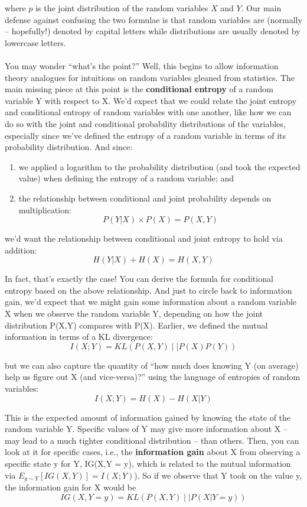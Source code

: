 \documentclass[letterpaper,12pt]{report}
\providecommand{\tightlist}{%
  \setlength{\itemsep}{0pt}\setlength{\parskip}{0pt}}
\begin{document}
where \(p\) is the joint distribution of the random variables \(X\) and \(Y\).
Our main defense against confusing the two formulae is that random variables are
(normally -- hopefully!) denoted by capital letters while distributions are usually
denoted by lowercase letters.
\\
\\
You may wonder ``what's the point?'' Well, this begins to allow information theory analogues
for intuitions on random variables gleaned from statistics. The main missing piece at this point
is the \textbf{conditional entropy} 
of a random variable Y with respect to X.
We'd expect that we could relate the joint entropy and conditional entropy of random variables
with one another, like how we can do so with the joint and conditional probability
distributions of the variables, especially since we've defined the entropy of a random
variable in terms of its probability distribution. And since:
\begin{enumerate}
  \tightlist
  \item 
    we applied a logarithm to the probability distribution (and took the expected value) when defining the entropy of a random variable; and
  \item
    the relationship between conditional and joint probability depends on multiplication:
    \[P(Y|X) \times P(X) = P(X,Y) \]
\end{enumerate}
we'd want the relationship between conditional and joint entropy to hold via addition:
\[ H(Y|X) + H(X) = H(X,Y) \]

In fact, that's exactly the case! You can derive the formula 
for conditional entropy based on the above relationship.
And just to circle back to information gain, we'd expect that we might gain some information
about a random variable X when we observe the random variable Y, depending on how the joint
distribution P(X,Y) compares with P(X). Earlier, we defined the mutual information in terms
of a KL divergence:
\[ I(X;Y) = KL\left(P(X,Y)\mid\mid P(X)P(Y)\right) \]

but we can also capture the quantity of ``how much does knowing Y (on average) help us figure
out X (and vice-versa)?'' using the language of entropies of random variables:
\[ I(X;Y) = H(X) - H(X|Y) \]

This is the expected amount of information gained 
by knowing the state of the random variable Y. 
Specific values of Y may give more information
about X -- may lead to a much tighter conditional distribution -- than others.
Then, you can look at it for specific cases, i.e., the
\textbf{information gain} 
about X from observing a specific state y for Y,
IG(X,Y = y), which is related to the mutual information via
\(E_{y \sim Y}\left[IG(X,Y)\right] = I(X;Y)\)).
So if we observe that Y took on the
value y, the information gain for X would be
\[ IG(X, Y = y) = KL\left(P(X,Y)\mid\mid P(X | Y = y)\right) \]
\end{document}
